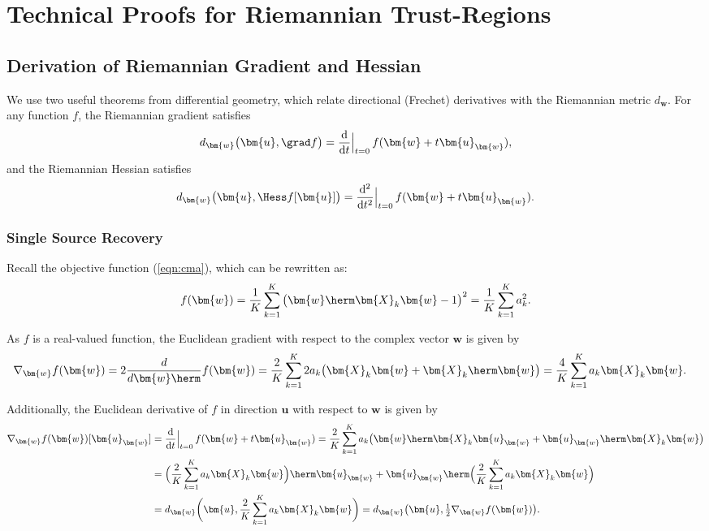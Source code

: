 \chapter{Technical Proofs for Riemannian Trust-Regions}\label{appdx:rtr}

\section{Derivation of Riemannian Gradient and Hessian} \label{appdxrtr:riemannDerivations}
We use two useful theorems from differential geometry, which relate directional (Frechet) derivatives with the Riemannian metric $d_{\bm{w}}$. For any function $f$, the Riemannian gradient satisfies
\begin{equation}
d_{\bm{w}}\big(\bm{u},\grad f\big)= \frac{\mathrm{d}}{\mathrm{d}t}\Big|_{t=0}\,f(\bm{w}+t\bm{u}_{\bm{w}}), \label{eqn:gradmetric}
\end{equation}
and the Riemannian Hessian satisfies
\begin{equation}
d_{\bm{w}}\big(\bm{u},\Hess f[\bm{u}]\big)= \frac{\mathrm{d}^2}{\mathrm{d}t^2}\Big|_{t=0}\,f(\bm{w}+t\bm{u}_{\bm{w}}). \label{eqn:hessmetric}
\end{equation}

\subsection{Single Source Recovery}
Recall the objective function (\ref{eqn:cma}), which can be rewritten as:
\begin{equation}
f(\bm{w})=\frac{1}{K}\sum_{k=1}^K\big(\bm{w}\herm\bm{X}_k\bm{w}-1\big)^2=\frac{1}{K}\sum_{k=1}^Ka_k^2.
\end{equation}

As $f$ is a real-valued function, the Euclidean gradient with respect to the complex vector $\bm{w}$ is given by
\begin{align}
\nabla_{\bm{w}}f(\bm{w})&=2\frac{d}{d\bm{w}\herm}f(\bm{w})=\frac{2}{K}\sum_{k=1}^K 2a_k\big(\bm{X}_k\bm{w}+\bm{X}_k\herm\bm{w}\big)=\frac{4}{K}\sum_{k=1}^K a_k\bm{X}_k\bm{w}.
\end{align}

Additionally, the Euclidean derivative of $f$ in direction $\bm{u}$ with respect to $\bm{w}$ is given by
\begin{align}
\nabla_{\bm{w}}f(\bm{w})[\bm{u}_{\bm{w}}]&=\frac{\mathrm{d}}{\mathrm{d}t}\Big|_{t=0}\,f(\bm{w}+t\bm{u}_{\bm{w}})=\frac{2}{K}\sum_{k=1}^Ka_k\big(\bm{w}\herm\bm{X}_k\bm{u}_{\bm{w}}+\bm{u}_{\bm{w}}\herm\bm{X}_k\bm{w}\big)\nonumber\\
&=\Big(\frac{2}{K}\sum_{k=1}^Ka_k\bm{X}_k\bm{w}\Big)\herm\bm{u}_{\bm{w}}+\bm{u}_{\bm{w}}\herm\Big(\frac{2}{K}\sum_{k=1}^Ka_k\bm{X}_k\bm{w}\Big)\nonumber\\
&=d_{\bm{w}}\bigg(\bm{u},\frac{2}{K}\sum_{k=1}^Ka_k\bm{X}_k\bm{w}\bigg)=d_{\bm{w}}\big(\bm{u},\tfrac{1}{2}\nabla_{\bm{w}}f(\bm{w})\big).
\end{align}

